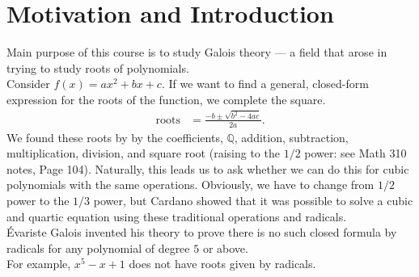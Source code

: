 \documentclass[8pt]{extarticle}
\title{}
\author{}
\date{}
\newcommand{\Q}{\mathbb{Q}}
\begin{document}
  \section{Motivation and Introduction}%
  Main purpose of this course is to study Galois theory --- a field that arose in trying to study roots of polynomials.\\

  Consider $f(x) = ax^2 + bx + c$. If we want to find a general, closed-form expression for the roots of the function, we complete the square.
  \begin{align*}
    \text{roots} &= \frac{-b \pm \sqrt{b^2-4ac}}{2a}.
  \end{align*}
  We found these roots by by the coefficients, $\Q$, addition, subtraction, multiplication, division, and square root (raising to the $1/2$ power: see Math 310 notes, Page 104). Naturally, this leads us to ask whether we can do this for cubic polynomials with the same operations. Obviously, we have to change from $1/2$ power to the $1/3$ power, but Cardano showed that it was possible to solve a cubic and quartic equation using these traditional operations and radicals.\\

  Évariste Galois invented his theory to prove there is no such closed formula by radicals for any polynomial of degree $5$ or above.\\

  For example, $x^5 - x + 1$ does not have roots given by radicals.
\end{document}
